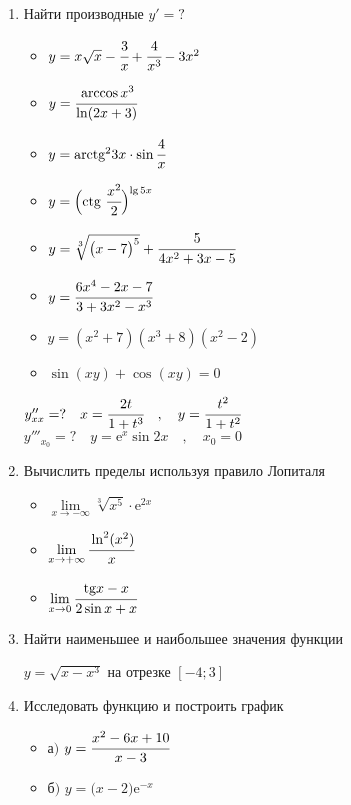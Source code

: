 \documentclass{article}
\begin{document}
\begin{multicols}{2}
\begin{enumerate}[label=\arabic*.]
	\item Найти производные $y'=?$
	\begin{multicols}{2}
		\begin{itemize}[label=""]
			\item $y=x\sqrt{x}-\cfrac{3}{x}+\cfrac{4}{x^3}-3x^2$
			\item $y=\cfrac{\arccos x^3}{\ln (2x+3)}$
			\item $y=\mbox{arctg}^23x \cdot \sin \cfrac{4}{x}$
			\item $y=\Big(\mbox{ctg}\ \cfrac{x^2}{2}\Big)^{\lg 5x}$
		\end{itemize}
		\vfill\null\columnbreak
		\begin{itemize}[label=""]
			\item $y=\sqrt[3]{\big(x-7\big)^5} + \cfrac{5}{4x^2+3x-5}$
			\item $y=\cfrac{6x^4 - 2x -7}{3+3x^2-x^3}$
			\item $y=(x^2 + 7)(x^3 + 8)(x^2 - 2)$
			\item $\sin(xy) + \cos(xy) = 0$
		\end{itemize}
	\end{multicols}
	\vspace{-3mm}
	$y''_{xx}=? \quad x=\cfrac{2t}{1+t^3} \quad,\quad y=\cfrac{t^2}{1 + t^2}$ \\
	$y'''_{x_0}=? \quad y=\mbox{e}^x \sin 2x \quad,\quad x_0=0$
	\item Вычислить пределы используя правило Лопиталя
	\begin{multicols}{3}
		\raggedcolumns
		\begin{itemize}[label=""]
			\item $\lim\limits_{x\to-\infty} \sqrt[3]{x^5}\cdot\mbox{e}^{2x}$
			\vfill\null\columnbreak
			\item $\lim\limits_{x\to+\infty}\cfrac{\ln^2(x^2)}{x}$
			\vfill\null\columnbreak
			\item $\lim\limits_{x\to 0}\cfrac{\mbox{tg}x - x}{2\sin x + x}$
			\vfill\null\columnbreak
		\end{itemize}
	\end{multicols}
	\vspace{-4mm}	
	\item Найти наименьшее и наибольшее значения функции

	$y=\sqrt{x-x^3}$ на отрезке $[-4;3]$
	\item Исследовать функцию и построить график
	\begin{multicols}{2}
		\begin{itemize}[label=""]
			\setlength\itemsep{0.5em}
			\item а$)$ $y=\cfrac{x^2-6x+10}{x-3}$
		\end{itemize}
		\vfill\null\columnbreak
		\begin{itemize}[label=""]
			\setlength\itemsep{0.5em}
			\item б$)$ $y=\big(x-2\big)\mbox{e}^{-x}$
		\end{itemize}
	\end{multicols}
\end{enumerate}	
\end{multicols}
 
\end{document}
